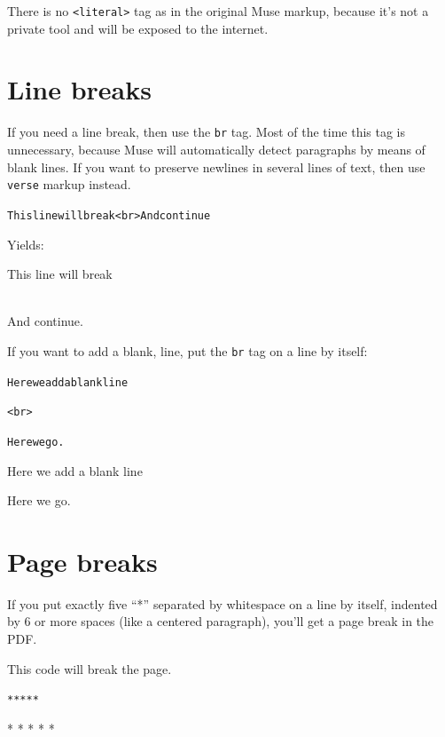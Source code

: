 \documentclass[DIV=12,%
               BCOR=0mm,%
               fontsize=10pt,%
               oneside,%
               paper=210mm:11in]{scrbook}
\newcommand*{\forcelinebreak}{\strut\\{}}
\begin{document}
There is no \texttt{<literal>} tag as in the original Muse markup, because it's
not a private tool and will be exposed to the internet.

\section{Line breaks}


If you need a line break, then use the \texttt{br} tag.  Most of the time
this tag is unnecessary, because Muse will automatically detect
paragraphs by means of blank lines.  If you want to preserve newlines in
several lines of text, then use \texttt{verse} markup instead.


\begin{alltt}
This line will break <br> And continue

\end{alltt}


Yields:


This line will break \forcelinebreak  And continue.



\bigskip


If you want to add a blank, line, put the \texttt{br} tag on a line by itself:


\begin{alltt}
Here we add a blank line

<br>

Here we go.

\end{alltt}


Here we add a blank line



\bigskip


Here we go.

\section{Page breaks}


If you put exactly five “*” separated by whitespace on a line by
itself, indented by 6 or more spaces (like a centered paragraph),
you'll get a page break in the PDF.


This code will break the page.


\begin{alltt}
       * * * * *

\end{alltt}



\begin{center}

* * * * *


\cleardoublepage


\end{center}
\end{document}
